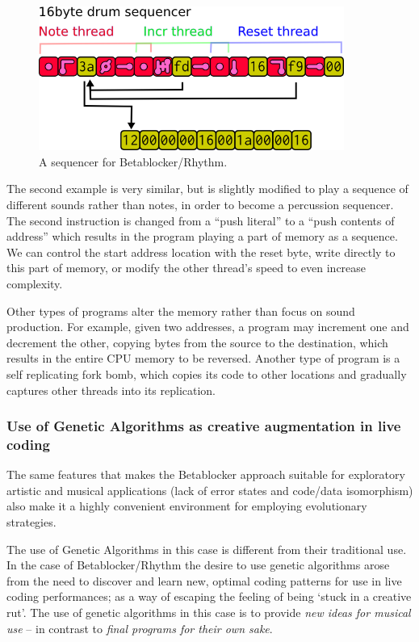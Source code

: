 \documentclass[letterpaper, 12pt]{article}
\begin{document}
\begin{figure}[H]
	\centering
		\includegraphics[width=10cm]{bbds-seq}
	\caption{A sequencer for Betablocker/Rhythm.}
	\label{fig:fig_bbds-seq}
\end{figure}

The second example is very similar, but is slightly modified to play a sequence of different sounds rather than notes, in order to become a percussion sequencer. The second instruction is changed from a ``push literal'' to a ``push contents of address'' which results in the program playing a part of memory as a sequence. We can control the start address location with the reset byte, write directly to this part of memory, or modify the other thread's speed to even increase complexity.

Other types of programs alter the memory rather than focus on sound production.
For example, given two addresses, a program may increment one and decrement the other, copying bytes from the source to the destination, which results in the entire CPU memory to be reversed.
Another type of program is a self replicating fork bomb, which copies its code to other locations and gradually captures other threads into its replication.
\parskip 18pt

\subsubsection{Use of Genetic Algorithms as creative augmentation in live coding} %
\label{sub:genetic_programming}

The same features that makes the Betablocker approach suitable for exploratory artistic and musical applications (lack of error states and code/data isomorphism) also make it a highly convenient environment for employing evolutionary strategies.

The use of Genetic Algorithms \citep{barricelli1963numerical} in this case is different from their traditional use. In the case of Betablocker/Rhythm the desire to use genetic algorithms arose from the need to discover and learn new, optimal coding patterns for use in live coding performances; as a way of escaping the feeling of being `stuck in a creative rut'. The use of genetic algorithms in this case is to provide \emph{new ideas for musical use} -- in contrast to \emph{final programs for their own sake}.
\end{document}
